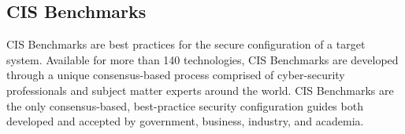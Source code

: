 \subsection*{CIS Benchmarks}
CIS Benchmarks are best practices for the secure configuration of a target system. Available for more than 140 technologies, CIS Benchmarks are developed through a unique consensus-based process comprised of cyber-security professionals and subject matter experts around the world. CIS Benchmarks are the only consensus-based, best-practice security configuration guides both developed and accepted by government, business, industry, and academia.



